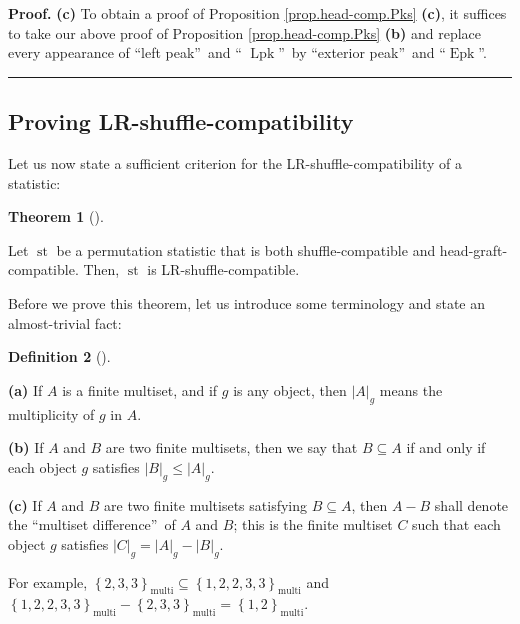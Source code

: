 \documentclass[numbers=enddot,12pt,final,onecolumn,notitlepage]{scrartcl}%
\theoremstyle{definition}
\newtheorem{theo}{Theorem}[section]
\newenvironment{theorem}[1][]
{\begin{theo}[#1]\begin{leftbar}}
{\end{leftbar}\end{theo}}
\newtheorem{defi}[theo]{Definition}
\newenvironment{definition}[1][]
{\begin{defi}[#1]\begin{leftbar}}
{\end{leftbar}\end{defi}}
\newenvironment{proof}[1][Proof]{\noindent\textbf{#1.} }{\ \rule{0.5em}{0.5em}}
\begin{document}
\begin{proof}
\textbf{(c)} To obtain a proof of Proposition \ref{prop.head-comp.Pks}
\textbf{(c)}, it suffices to take our above proof of Proposition
\ref{prop.head-comp.Pks} \textbf{(b)} and replace every appearance of
\textquotedblleft left peak\textquotedblright\ and \textquotedblleft%
$\operatorname*{Lpk}$\textquotedblright\ by \textquotedblleft exterior
peak\textquotedblright\ and
\textquotedblleft$\operatorname{Epk}$\textquotedblright.
\end{proof}

\subsection{Proving LR-shuffle-compatibility}

Let us now state a sufficient criterion for the LR-shuffle-compatibility of a statistic:

\begin{theorem}
\label{thm.head-comp.LRcomp}Let $\operatorname{st}$ be a permutation
statistic that is both shuffle-compatible and head-graft-compatible. Then,
$\operatorname{st}$ is LR-shuffle-compatible.
\end{theorem}

Before we prove this theorem, let us introduce some terminology and state an
almost-trivial fact:

\begin{definition}
\textbf{(a)} If $A$ is a finite multiset, and if $g$ is any object, then
$\left\vert A\right\vert _{g}$ means the multiplicity of $g$ in $A$.

\textbf{(b)} If $A$ and $B$ are two finite multisets, then we say that
$B\subseteq A$ if and only if each object $g$ satisfies $\left\vert
B\right\vert _{g}\leq\left\vert A\right\vert _{g}$.

\textbf{(c)} If $A$ and $B$ are two finite multisets satisfying $B\subseteq
A$, then $A-B$ shall denote the \textquotedblleft multiset
difference\textquotedblright\ of $A$ and $B$; this is the finite
multiset $C$ such
that each object $g$ satisfies $\left\vert C\right\vert _{g}=\left\vert
A\right\vert _{g}-\left\vert B\right\vert _{g}$.
\end{definition}

For example, $\left\{  2,3,3\right\}  _{\operatorname*{multi}}\subseteq
\left\{  1,2,2,3,3\right\}  _{\operatorname*{multi}}$ and $\left\{
1,2,2,3,3\right\}  _{\operatorname*{multi}}-\left\{  2,3,3\right\}
_{\operatorname*{multi}}=\left\{  1,2\right\}  _{\operatorname*{multi}}$.
\end{document}
